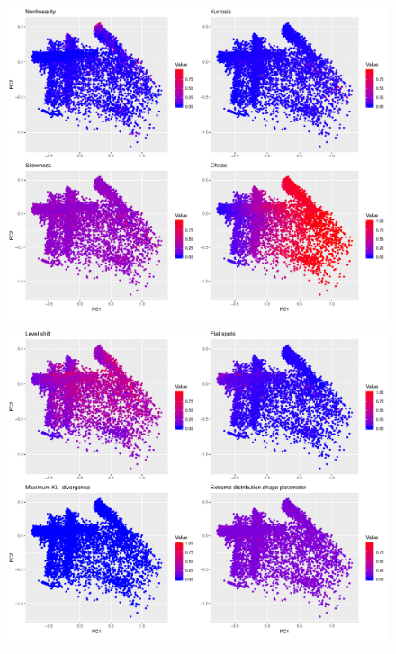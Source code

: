 \documentclass[a4paper,12pt]{article}
\begin{document}
 
 \newpage
 \begin{figure}[!h]
 	
 	\begin{center}
 		\includegraphics[width=0.7
 		\textwidth]{str_3}%
 		
 		\includegraphics[width=0.8
 		\textwidth]{str_4}%
 	\end{center}
 	
 	
 \end{figure} 
	
\newpage
\end{document}
